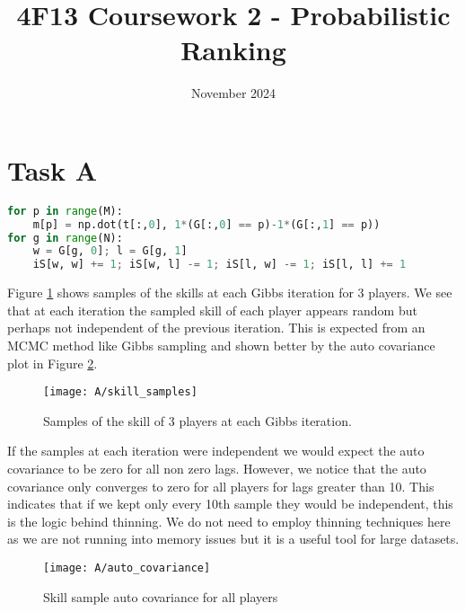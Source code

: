 \documentclass[11pt]{article}
\title{\vspace{-2cm}4F13 Coursework 2 - Probabilistic Ranking}
\author{}
\date{November 2024}
\begin{document}


\setcounter{page}{1}

\maketitle

\section{Task A}

\begin{lstlisting}[caption=Python calculation of mean and covariance matrix of skills given performances for Gibbs sampling., label=lst:A, captionpos=b, basicstyle=\small, frame=tlrb, language=Python]
for p in range(M):
    m[p] = np.dot(t[:,0], 1*(G[:,0] == p)-1*(G[:,1] == p))
for g in range(N):
    w = G[g, 0]; l = G[g, 1]
    iS[w, w] += 1; iS[w, l] -= 1; iS[l, w] -= 1; iS[l, l] += 1
\end{lstlisting}

Figure \ref{fig:A_skill_samples} shows samples of the skills at each Gibbs iteration for 3 players. We see that at each iteration the sampled skill of each player appears random but perhaps not independent of the previous iteration. This is expected from an MCMC method like Gibbs sampling and shown better by the auto covariance plot in Figure \ref{fig:A_auto_covariance}. 

\begin{figure}[h]
    \centering
    \texttt{[image: A/skill\_samples]} 
    \caption{Samples of the skill of 3 players at each Gibbs iteration.}
    \label{fig:A_skill_samples}
\end{figure}

If the samples at each iteration were independent we would expect the auto covariance to be zero for all non zero lags. However, we notice that the auto covariance only converges to zero for all players for lags greater than 10. This indicates that if we kept only every 10th sample they would be independent, this is the logic behind thinning. We do not need to employ thinning techniques here as we are not running into memory issues but it is a useful tool for large datasets.

\begin{figure}[h]
    \centering
    \texttt{[image: A/auto\_covariance]} 
    \caption{Skill sample auto covariance for all players}
    \label{fig:A_auto_covariance}
\end{figure}
\end{document}
